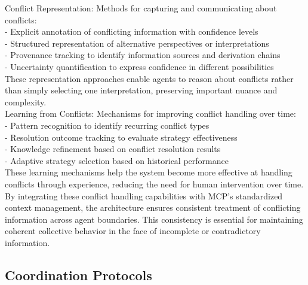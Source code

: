 Conflict Representation: Methods for capturing and communicating about conflicts:\\ \newline
- Explicit annotation of conflicting information with confidence levels\\ \newline
- Structured representation of alternative perspectives or interpretations\\ \newline
- Provenance tracking to identify information sources and derivation chains\\ \newline
- Uncertainty quantification to express confidence in different possibilities\\ \newline
These representation approaches enable agents to reason about conflicts rather than simply selecting one interpretation, preserving important nuance and complexity.\\ \newline
Learning from Conflicts: Mechanisms for improving conflict handling over time:\\ \newline
- Pattern recognition to identify recurring conflict types\\ \newline
- Resolution outcome tracking to evaluate strategy effectiveness\\ \newline
- Knowledge refinement based on conflict resolution results\\ \newline
- Adaptive strategy selection based on historical performance\\ \newline
These learning mechanisms help the system become more effective at handling conflicts through experience, reducing the need for human intervention over time.\\ \newline
By integrating these conflict handling capabilities with MCP's standardized context management, the architecture ensures consistent treatment of conflicting information across agent boundaries. This consistency is essential for maintaining coherent collective behavior in the face of incomplete or contradictory information.\\
\subsection{Coordination Protocols}

